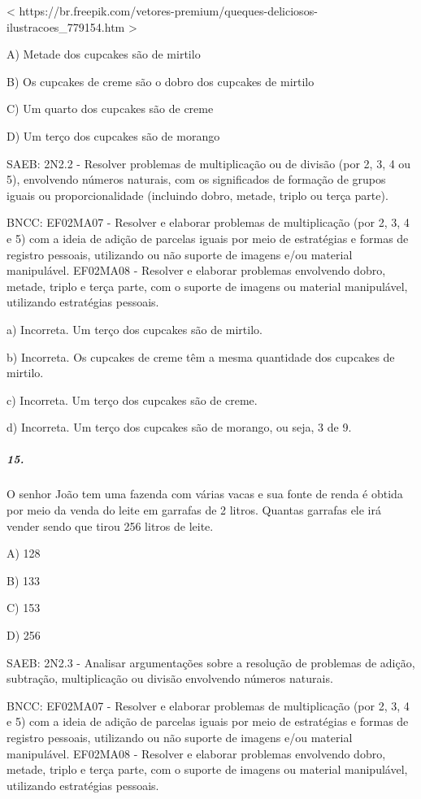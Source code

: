 \textless{}
https://br.freepik.com/vetores-premium/queques-deliciosos-ilustracoes\_779154.htm
\textgreater{}

A) Metade dos cupcakes são de mirtilo

B) Os cupcakes de creme são o dobro dos cupcakes de mirtilo

C) Um quarto dos cupcakes são de creme

D) Um terço dos cupcakes são de morango

SAEB: 2N2.2 - Resolver problemas de multiplicação ou de divisão (por 2,
3, 4 ou 5), envolvendo números naturais, com os significados de formação
de grupos iguais ou proporcionalidade (incluindo dobro, metade, triplo
ou terça parte).

BNCC: EF02MA07 - Resolver e elaborar problemas de multiplicação (por 2,
3, 4 e 5) com a ideia de adição de parcelas iguais por meio de
estratégias e formas de registro pessoais, utilizando ou não suporte de
imagens e/ou material manipulável. EF02MA08 - Resolver e elaborar
problemas envolvendo dobro, metade, triplo e terça parte, com o suporte
de imagens ou material manipulável, utilizando estratégias pessoais.

a) Incorreta. Um terço dos cupcakes são de mirtilo.

b) Incorreta. Os cupcakes de creme têm a mesma quantidade dos cupcakes
de mirtilo.

c) Incorreta. Um terço dos cupcakes são de creme.

d) Incorreta. Um terço dos cupcakes são de morango, ou seja, 3 de 9.

\subparagraph{15. }\label{section-144}

O senhor João tem uma fazenda com várias vacas e sua fonte de renda é
obtida por meio da venda do leite em garrafas de 2 litros. Quantas
garrafas ele irá vender sendo que tirou 256 litros de leite.

A) 128

B) 133

C) 153

D) 256

SAEB: 2N2.3 - Analisar argumentações sobre a resolução de problemas de
adição, subtração, multiplicação ou divisão envolvendo números naturais.

BNCC: EF02MA07 - Resolver e elaborar problemas de multiplicação (por 2,
3, 4 e 5) com a ideia de adição de parcelas iguais por meio de
estratégias e formas de registro pessoais, utilizando ou não suporte de
imagens e/ou material manipulável. EF02MA08 - Resolver e elaborar
problemas envolvendo dobro, metade, triplo e terça parte, com o suporte
de imagens ou material manipulável, utilizando estratégias pessoais.

